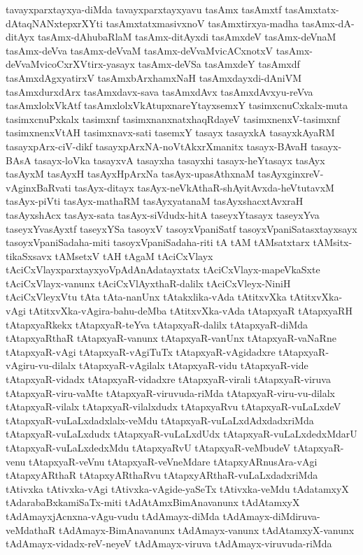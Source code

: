 {tavayxparxtayxya-diMda
tavayxparxtayxyavu
tasAmx
tasAmxtf
tasAmxtatx-dAtaqNANxtepxrXYti
tasAmxtatxmasivxnoV
tasAmxtirxya-madha
tasAmx-dA-ditAyx
tasAmx-dAhubaRlaM
tasAmx-ditAyxdi
tasAmxdeV
tasAmx-deVnaM
tasAmx-deVva
tasAmx-deVvaM
tasAmx-deVvaMvicACxnotxV
tasAmx-deVvaMvicoCxrXVtirx-yasayx
tasAmx-deVSa
tasAmxdeY
tasAmxdf
tasAmxdAgxyatirxV
tasAmxbArxhamxNaH
tasAmxdayxdi-dAniVM
tasAmxdurxdArx
tasAmxdavx-sava
tasAmxdAvx
tasAmxdAvxyu-reVva
tasAmxlolxVkAtf
tasAmxlolxVkAtupxnareYtayxsemxY
tasimxcnuCxkalx-muta
tasimxcnuPxkalx
tasimxnf
tasimxnanxnatxhaqRdayeV
tasimxnenxV-tasimxnf
tasimxnenxVtAH
tasimxnavx-sati
tasemxY
tasayx
tasayxkA
tasayxkAyaRM
tasayxpArx-ciV-dikf
tasayxpArxNA-noVtAkxrXmanitx
tasayx-BAvaH
tasayx-BAsA
tasayx-loVka
tasayxvA
tasayxha
tasayxhi
tasayx-heYtasayx
tasAyx
tasAyxM
tasAyxH
tasAyxHpArxNa
tasAyx-upasAthxnaM
tasAyxginxreV-vAginxBaRvati
tasAyx-ditayx
tasAyx-neVkAthaR-shAyitAvxda-heVtutavxM
tasAyx-piVti
tasAyx-mathaRM
tasAyxyatanaM
tasAyxshacxtAvxraH
tasAyxshAcx
tasAyx-sata
tasAyx-siVdudx-hitA
taseyxYtasayx
taseyxYva
taseyxYvasAyxtf
taseyxYSa
tasoyxV
tasoyxVpaniSatf
tasoyxVpaniSatasxtayxsayx
tasoyxVpaniSadaha-miti
tasoyxVpaniSadaha-riti
tA
tAM
tAMsatxtarx
tAMsitx-tikaSxsavx
tAMsetxV
tAH
tAgaM
tAciCxVlayx
tAciCxVlayxparxtayxyoVpAdAnAdatayxtatx
tAciCxVlayx-mapeVkaSxte
tAciCxVlayx-vanunx
tAciCxVlAyxthaR-dalilx
tAciCxVleyx-NiniH
tAciCxVleyxVtu
tAta
tAta-nanUnx
tAtakxlika-vAda
tAtitxvXka
tAtitxvXka-vAgi
tAtitxvXka-vAgira-bahu-deMba
tAtitxvXka-vAda
tAtapxyaR
tAtapxyaRH
tAtapxyaRkekx
tAtapxyaR-teYva
tAtapxyaR-dalilx
tAtapxyaR-diMda
tAtapxyaRthaR
tAtapxyaR-vanunx
tAtapxyaR-vanUnx
tAtapxyaR-vaNaRne
tAtapxyaR-vAgi
tAtapxyaR-vAgiTuTx
tAtapxyaR-vAgidadxre
tAtapxyaR-vAgiru-vu-dilalx
tAtapxyaR-vAgilalx
tAtapxyaR-vidu
tAtapxyaR-vide
tAtapxyaR-vidadx
tAtapxyaR-vidadxre
tAtapxyaR-virali
tAtapxyaR-viruva
tAtapxyaR-viru-vaMte
tAtapxyaR-viruvuda-riMda
tAtapxyaR-viru-vu-dilalx
tAtapxyaR-vilalx
tAtapxyaR-vilalxdudx
tAtapxyaRvu
tAtapxyaR-vuLaLxdeV
tAtapxyaR-vuLaLxdadxlalx-veMdu
tAtapxyaR-vuLaLxdAdxdadxriMda
tAtapxyaR-vuLaLxdudx
tAtapxyaR-vuLaLxdUdx
tAtapxyaR-vuLaLxdedxMdarU
tAtapxyaR-vuLaLxdedxMdu
tAtapxyaRvU
tAtapxyaR-veMbudeV
tAtapxyaR-venu
tAtapxyaR-veVnu
tAtapxyaR-veVneMdare
tAtapxyARnusAra-vAgi
tAtapxyARthaR
tAtapxyARthaRvu
tAtapxyARthaR-vuLaLxdadxriMda
tAtivxka
tAtivxka-vAgi
tAtivxka-vAgide-yaSeTx
tAtivxka-veMdu
tAdatamxyX
tAdarabaBxkamiSaTx-miti
tAdAtAmxBimAnavanunx
tAdAtamxyX
tAdAmayxjAcnxna-vAgu-vudu
tAdAmayx-diMda
tAdAmayx-diMdiruva-veMdathaR
tAdAmayx-BimAnavanunx
tAdAmayx-vanunx
tAdAtamxyX-vanunx
tAdAmayx-vidadx-reV-neyeV
tAdAmayx-viruva
tAdAmayx-viruvuda-riMda
}
